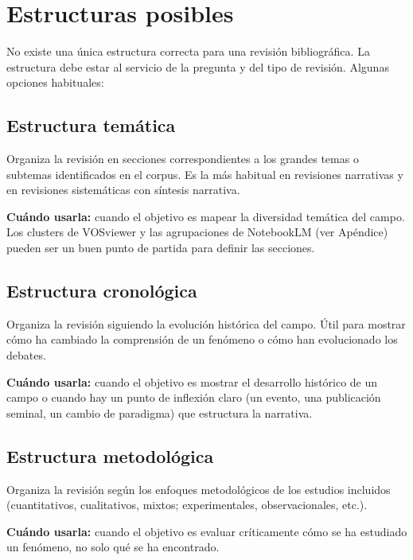 \documentclass[
]{book}
\begin{document}
\section{Estructuras posibles}\label{estructuras-posibles}

No existe una única estructura correcta para una revisión bibliográfica. La estructura debe estar al servicio de la pregunta y del tipo de revisión. Algunas opciones habituales:

\subsection{Estructura temática}\label{estructura-temuxe1tica}

Organiza la revisión en secciones correspondientes a los grandes temas o subtemas identificados en el corpus. Es la más habitual en revisiones narrativas y en revisiones sistemáticas con síntesis narrativa.

\textbf{Cuándo usarla:} cuando el objetivo es mapear la diversidad temática del campo. Los clusters de VOSviewer y las agrupaciones de NotebookLM (ver Apéndice) pueden ser un buen punto de partida para definir las secciones.

\subsection{Estructura cronológica}\label{estructura-cronoluxf3gica}

Organiza la revisión siguiendo la evolución histórica del campo. Útil para mostrar cómo ha cambiado la comprensión de un fenómeno o cómo han evolucionado los debates.

\textbf{Cuándo usarla:} cuando el objetivo es mostrar el desarrollo histórico de un campo o cuando hay un punto de inflexión claro (un evento, una publicación seminal, un cambio de paradigma) que estructura la narrativa.

\subsection{Estructura metodológica}\label{estructura-metodoluxf3gica}

Organiza la revisión según los enfoques metodológicos de los estudios incluidos (cuantitativos, cualitativos, mixtos; experimentales, observacionales, etc.).

\textbf{Cuándo usarla:} cuando el objetivo es evaluar críticamente cómo se ha estudiado un fenómeno, no solo qué se ha encontrado.
\end{document}
